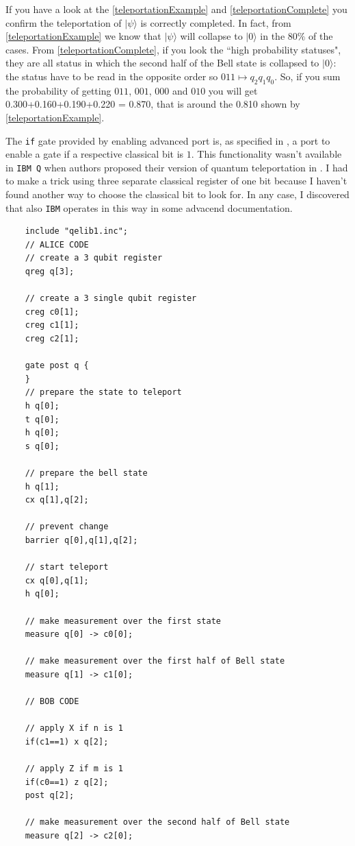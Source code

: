 \documentclass[a4paper,10pt]{article}
\begin{document}
If you have a look at the \autoref{teleportationExample} and \autoref{teleportationComplete} you confirm the teleportation of $|\psi\rangle$ is correctly completed. In fact, from \autoref{teleportationExample} we know that $|\psi\rangle$ will collapse to $|0\rangle$ in the $80\%$ of the cases. From \autoref{teleportationComplete}, if you look the ``high probability statuses", they are all status in which the second half of the Bell state is collapsed to $|0\rangle$: the status have to be read in the opposite order so $011 \mapsto q_{2}q_{1}q_{0}$. So, if you sum the probability of getting $011$, $001$, $000$ and $010$ you will get 0.300+0.160+0.190+0.220 = 0.870, that is around the 0.810 shown by \autoref{teleportationExample}.

The \texttt{if} gate provided by enabling advanced port is, as specified in \cite{qasm2}, a port to enable a gate if a respective classical bit is $1$. This functionality wasn't available in \texttt{IBM Q} when authors proposed their version of quantum teleportation in \cite{teleportationUnderExp}. I had to make a trick using three separate classical register of one bit because I haven't found another way to choose the classical bit to look for. In any case, I discovered that also \texttt{IBM} operates in this way in some advacend documentation.

\begin{lstlisting}
    include "qelib1.inc";
    // ALICE CODE
    // create a 3 qubit register
    qreg q[3];
    
    // create a 3 single qubit register
    creg c0[1];
    creg c1[1];
    creg c2[1];
    
    gate post q {
    }
    // prepare the state to teleport
    h q[0];
    t q[0];
    h q[0];
    s q[0];

    // prepare the bell state
    h q[1];
    cx q[1],q[2];

    // prevent change
    barrier q[0],q[1],q[2];

    // start teleport
    cx q[0],q[1];
    h q[0];
    
    // make measurement over the first state
    measure q[0] -> c0[0];
    
    // make measurement over the first half of Bell state
    measure q[1] -> c1[0];

    // BOB CODE

    // apply X if n is 1
    if(c1==1) x q[2];

    // apply Z if m is 1
    if(c0==1) z q[2];
    post q[2];

    // make measurement over the second half of Bell state
    measure q[2] -> c2[0];
\end{lstlisting}
\end{document}
